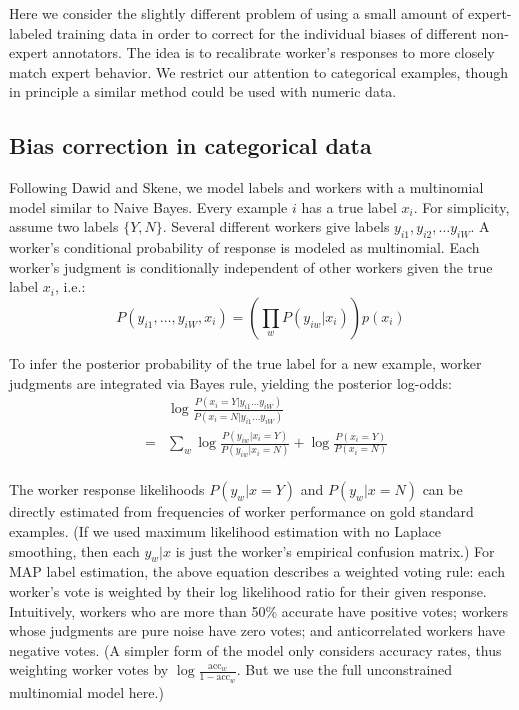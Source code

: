 \documentclass[11pt]{article}
\begin{document}
Here we consider the slightly different problem of using a small amount of expert-labeled training data in order to correct for the individual biases of different non-expert annotators.  The idea is to recalibrate worker's responses to more closely match expert behavior.  We restrict our attention to categorical examples, though in principle a similar method could be used with numeric data.
\vspace*{-0.1in}
\subsection{ Bias correction in categorical data }

Following Dawid and Skene, we model labels and workers with a multinomial model similar to Naive Bayes.
Every example $i$ has a true label $x_i$.  For simplicity, assume two labels $\{Y,N\}$.   Several different workers give labels $y_{i1}, y_{i2}, \ldots y_{iW}$.  A worker's conditional probability of response is modeled as multinomial.  Each worker's judgment is conditionally independent of other workers given the true label $x_i$, i.e.:
\[ P(y_{i1}, \ldots, y_{iW}, x_i) = \left( \prod_{w} P(y_{iw} | x_i) \right) p(x_i) \]

To infer the posterior probability of the true label for a new example, worker judgments are integrated via Bayes rule, yielding the posterior log-odds:
\begin{eqnarray*}
&& \log \frac{P(x_i = Y  | y_{i1} \ldots y_{iW}) }{ P(x_i=N | y_{i1} \ldots y_{iW})  }  \\
&=& \sum_w \log \frac{ P(y_{iw} | x_i = Y) }{ P(y_{iw} | x_i = N) } + \log \frac{P(x_i=Y)}{P(x_i=N)} \\
\end{eqnarray*}

The worker response likelihoods $P(y_w | x=Y)$ and $P(y_w | x=N)$ can be directly estimated from frequencies of worker performance on gold standard examples.  
(If we used maximum likelihood estimation with no Laplace smoothing, then each $y_w | x$ is just the worker's empirical confusion matrix.)  For MAP label estimation, the above equation describes a weighted voting rule: each worker's vote is weighted by their log likelihood ratio for their given response.  Intuitively, workers who are more than 50\% accurate have positive votes; workers whose judgments are pure noise have zero votes; and anticorrelated workers have negative votes.  (A simpler form of the model only considers accuracy rates, thus weighting worker votes by $\log \frac{\textrm{acc}_w}{1-\textrm{acc}_w}$.  But we use the full unconstrained multinomial model here.)
\end{document}
